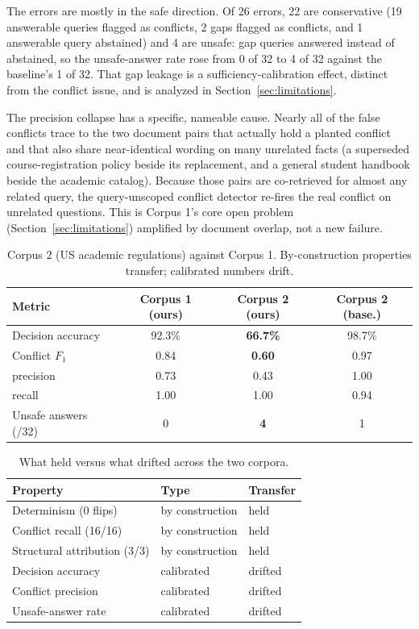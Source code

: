 \documentclass[conference]{IEEEtran}
\begin{document}
The errors are mostly in the safe direction. Of 26 errors, 22 are conservative
(19 answerable queries flagged as conflicts, 2 gaps flagged as conflicts, and
1 answerable query abstained) and 4 are unsafe: gap queries answered instead
of abstained, so the unsafe-answer rate rose from 0 of 32 to 4 of 32 against
the baseline's 1 of 32. That gap leakage is a sufficiency-calibration effect,
distinct from the conflict issue, and is analyzed in
Section~\ref{sec:limitations}.

The precision collapse has a specific, nameable cause. Nearly all of the false
conflicts trace to the two document pairs that actually hold a planted conflict
and that also share near-identical wording on many unrelated facts (a
superseded course-registration policy beside its replacement, and a general
student handbook beside the academic catalog). Because those pairs are
co-retrieved for almost any related query, the query-unscoped conflict detector
re-fires the real conflict on unrelated questions. This is Corpus 1's core open
problem (Section~\ref{sec:limitations}) amplified by document overlap, not a
new failure.

\begin{table}[htbp]
\caption{Corpus 2 (US academic regulations) against Corpus 1. By-construction
properties transfer; calibrated numbers drift.}
\label{tab:corpus2}
\centering
\small
\begin{tabularx}{\columnwidth}{@{}X c c c@{}}
\toprule
Metric & Corpus 1 (ours) & Corpus 2 (ours) & Corpus 2 (base.) \\
\midrule
Decision accuracy       & 92.3\% & \textbf{66.7\%} & 98.7\% \\
Conflict $F_1$          & 0.84   & \textbf{0.60}   & 0.97 \\
\quad precision         & 0.73   & 0.43            & 1.00 \\
\quad recall            & 1.00   & 1.00            & 0.94 \\
Unsafe answers (/32)    & 0      & \textbf{4}      & 1 \\
\bottomrule
\end{tabularx}
\end{table}

\begin{table}[htbp]
\caption{What held versus what drifted across the two corpora.}
\label{tab:heldvsdrifted}
\centering
\small
\begin{tabularx}{\columnwidth}{@{}X l l@{}}
\toprule
Property & Type & Transfer \\
\midrule
Determinism (0 flips)          & by construction & held \\
Conflict recall (16/16)        & by construction & held \\
Structural attribution (3/3)   & by construction & held \\
Decision accuracy              & calibrated      & drifted \\
Conflict precision             & calibrated      & drifted \\
Unsafe-answer rate             & calibrated      & drifted \\
\bottomrule
\end{tabularx}
\end{table}
\end{document}
